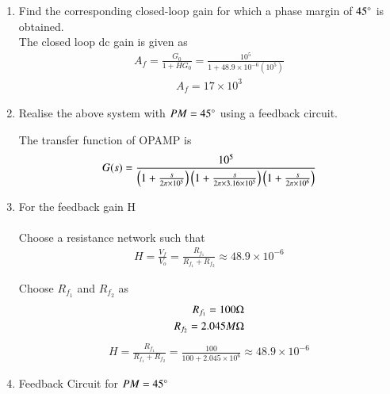 \begin{enumerate}[label=\arabic*.,ref=\theenumi]
\item Find the corresponding closed-loop gain for which a phase margin of $45\degree$ is obtained.\\
\solution The closed loop dc gain is given as
\begin{align}
A_{f} = \frac{G_{0}}{1+HG_{0}}=\frac{10^5}{1+48.9\times10^{-6}(10^5)}
\end{align} 
\begin{align}
A_{f} = 17\times10^3
\end{align}


\item Realise the above system with $PM = 45 \degree$ using a feedback circuit.\\
\solution
\begin{figure}[ht!]
	\begin{center}
		\resizebox{\columnwidth/1}{!}{}
	\end{center}
	\caption{}
	\label{fig:ee18btech11016_figa}
\end{figure}

The transfer function of OPAMP is
\begin{align}
    G(s) = \frac{10^{5}}{\left(1+\frac{s}{2\pi \times 10^5}\right)\left(1+\frac{s}{2\pi \times3.16 \times 10^{5}}\right)\left(1+\frac{s}{2\pi \times 10^{6}}\right)}
\end{align}
%
\item For the feedback gain H\\
\solution\\
Choose a resistance network such that
\begin{align}
    H = \frac{V_{f}}{V_{o}} = \frac{R_{f_{1}}}{R_{f_{1}}+R_{f_{2}}} \approx 48.9\times10^{-6}
\end{align}
\begin{figure}[ht!]
	\begin{center}
		\resizebox{\columnwidth/2}{!}{}
	\end{center}
	\caption{}
	\label{fig:ee18btech11016_figb}
\end{figure}

Choose $R_{f_{1}}$ and $R_{f_{2}}$ as
\begin{align}
    R_{f_{1}} = 100\ohm\\
    R_{f_{2}} = 2.045M\ohm
\end{align}
\begin{align}
H = \frac{R_{f_{1}}}{R_{f_{1}}+R_{f_{2}}} = \frac{100}{100+2.045\times10^6} \approx 48.9\times10^{-6}
\end{align}
\item Feedback Circuit for $PM = 45\degree$
\\
\solution
\begin{figure}[ht!]
	\begin{center}
		\resizebox{\columnwidth}{!}{}
	\end{center}
	\caption{}
	\label{fig:ee18btech11016_figc}
\end{figure}


\end{enumerate}
